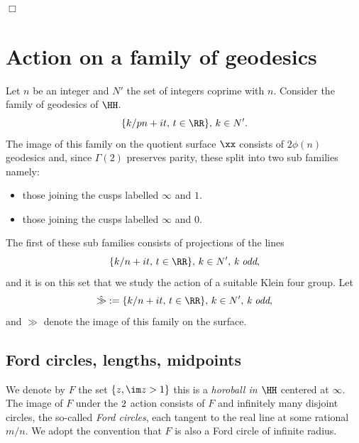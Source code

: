 \hfill $\Box$

%


\section{Action on a family of geodesics}

Let $n$ be an integer and 
$N'$  the set of integers coprime with $n$.
Consider the family of geodesics of $\HH$.
$$\{  k/pn+ i t,\, t \in \RR \},\, k \in N'.$$
The image of this family on the quotient surface $\xx$ consists
of $2\phi(n)$ geodesics 
and, since $\Gamma(2)$ preserves parity, these split into two sub families namely:
\begin{itemize}
\item those joining the cusps labelled $\infty$ and $1$.
\item those joining the cusps labelled $\infty$ and $0$.
\end{itemize}
The first of these sub families consists of projections of the lines
$$ \{  k/n+ i t,\, t \in \RR \},\, k \in N',\, \textit{k odd},$$
and it is on this set that we study the action of a suitable Klein four group.
Let 
$$\hat{\gg} :=  \{  k/n+ i t,\, t \in \RR \},\, k \in N',\, \textit{k odd},$$
and  $\gg$  denote the image of this family on the surface.


\subsection{Ford circles, lengths, midpoints} 
\label{lengths}

We denote by $F$ the set  $\{ z, \im z > 1\}$
this is a \textit{horoball in $\HH$} centered at $\infty$.
The image of $F$ under the $\sl2$ action consists of
$F$ and infinitely many disjoint circles, the so-called \textit{Ford circles}, 
each tangent to the real line at some rational $m/n$.
We adopt the convention that $F$ is also a Ford circle of infinite radius.


